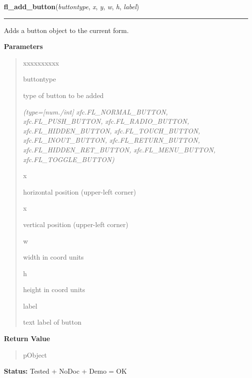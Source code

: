 \hspace{.8\funcindent}\begin{boxedminipage}{\funcwidth}

    \raggedright \textbf{fl\_add\_button}(\textit{buttontype}, \textit{x}, \textit{y}, \textit{w}, \textit{h}, \textit{label})

    \vspace{-1.5ex}

    \rule{\textwidth}{0.5\fboxrule}
\setlength{\parskip}{2ex}
    Adds a button object to the current form.

\setlength{\parskip}{1ex}
      \textbf{Parameters}
      \vspace{-1ex}

      \begin{quote}
        \begin{Ventry}{xxxxxxxxxx}

          \item[buttontype]

          type of button to be added

            {\it (type=[num./int] xfc.FL\_NORMAL\_BUTTON, xfc.FL\_PUSH\_BUTTON, 
xfc.FL\_RADIO\_BUTTON, xfc.FL\_HIDDEN\_BUTTON, xfc.FL\_TOUCH\_BUTTON, 
xfc.FL\_INOUT\_BUTTON, xfc.FL\_RETURN\_BUTTON, xfc.FL\_HIDDEN\_RET\_BUTTON,
xfc.FL\_MENU\_BUTTON, xfc.FL\_TOGGLE\_BUTTON)}

          \item[x]

          horizontal position (upper-left corner)

          \item[x]

          vertical position (upper-left corner)

          \item[w]

          width in coord units

          \item[h]

          height in coord units

          \item[label]

          text label of button

        \end{Ventry}

      \end{quote}

      \textbf{Return Value}
    \vspace{-1ex}

      \begin{quote}
      pObject

      \end{quote}

\textbf{Status:} Tested + NoDoc + Demo = OK



    \end{boxedminipage}


